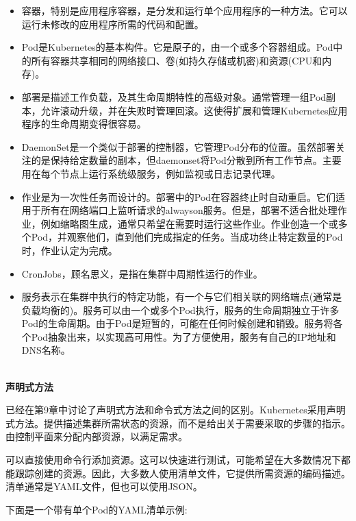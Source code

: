 \begin{itemize}
\item 
容器，特别是应用程序容器，是分发和运行单个应用程序的一种方法。它可以运行未修改的应用程序所需的代码和配置。

\item 
Pod是Kubernetes的基本构件。它是原子的，由一个或多个容器组成。Pod中的所有容器共享相同的网络接口、卷(如持久存储或机密)和资源(CPU和内存)。

\item 
部署是描述工作负载，及其生命周期特性的高级对象。通常管理一组Pod副本，允许滚动升级，并在失败时管理回滚。这使得扩展和管理Kubernetes应用程序的生命周期变得很容易。

\item 
DaemonSet是一个类似于部署的控制器，它管理Pod分布的位置。虽然部署关注的是保持给定数量的副本，但daemonset将Pod分散到所有工作节点。主要用在每个节点上运行系统级服务，例如监视或日志记录代理。

\item 
作业是为一次性任务而设计的。部署中的Pod在容器终止时自动重启。它们适用于所有在网络端口上监听请求的alwayson服务。但是，部署不适合批处理作业，例如缩略图生成，通常只希望在需要时运行这些作业。作业创造一个或多个Pod，并观察他们，直到他们完成指定的任务。当成功终止特定数量的Pod时，作业认定为完成。

\item 
CronJobs，顾名思义，是指在集群中周期性运行的作业。

\item 
服务表示在集群中执行的特定功能，有一个与它们相关联的网络端点(通常是负载均衡的)。服务可以由一个或多个Pod执行，服务的生命周期独立于许多Pod的生命周期。由于Pod是短暂的，可能在任何时候创建和销毁。服务将各个Pod抽象出来，以实现高可用性。为了方便使用，服务有自己的IP地址和DNS名称。
\end{itemize}

\hspace*{\fill} \\ %
\noindent
\textbf{声明式方法}

已经在第9章中讨论了声明式方法和命令式方法之间的区别。Kubernetes采用声明式方法。提供描述集群所需状态的资源，而不是给出关于需要采取的步骤的指示。由控制平面来分配内部资源，以满足需求。

可以直接使用命令行添加资源。这可以快速进行测试，可能希望在大多数情况下都能跟踪创建的资源。因此，大多数人使用清单文件，它提供所需资源的编码描述。清单通常是YAML文件，但也可以使用JSON。

下面是一个带有单个Pod的YAML清单示例:

